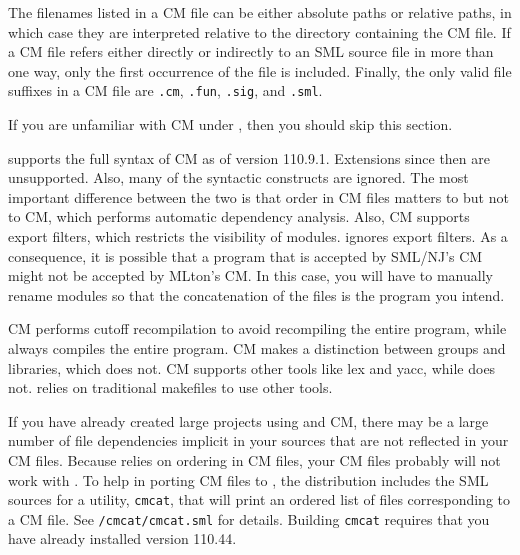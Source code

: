 The filenames listed in a CM file can be either absolute paths or relative
paths, in which case they are interpreted relative to the directory containing
the CM file.  If a CM file refers either directly or indirectly to an SML source
file in more than one way, only the first occurrence of the file is included.
Finally, the only valid file suffixes in a CM file are {\tt .cm}, {\tt .fun},
{\tt .sig}, and {\tt .sml}.
%

If you are unfamiliar with CM under {\smlnj}, then you should skip this
section.

{\mlton} supports the full syntax of CM as of {\smlnj} version 110.9.1.
Extensions since then are unsupported.  Also, many of the syntactic
constructs are ignored.  The most important difference between the two is that
order in CM files matters to {\mlton} but not to CM, which performs automatic
dependency analysis.  Also, CM supports export filters, which restricts the
visibility of modules.  {\mlton} ignores export filters.  As a consequence, it
is possible that a program that is accepted by SML/NJ's CM might not be accepted
by MLton's CM.  In this case, you will have to manually rename modules so that
the concatenation of the files is the program you intend.

CM performs cutoff recompilation to avoid recompiling the entire program, while
{\mlton} always compiles the entire program.  CM makes a distinction between
groups and libraries, which {\mlton} does not.  CM supports other tools like lex
and yacc, while {\mlton} does not.  {\mlton} relies on traditional makefiles to
use other tools.
%

If you have already created large projects using {\smlnj} and CM, there may be a
large number of file dependencies implicit in your sources that are not
reflected in your CM files.  Because {\mlton} relies on ordering in CM files,
your CM files probably will not work with {\mlton}.  To help in porting CM files
to {\mlton}, the {\mlton} distribution includes the SML sources for a
utility, {\tt cmcat}, that will print an ordered list of files corresponding to
a CM file.  See {\tt \doc/cmcat/cmcat.sml} for details.  Building {\tt cmcat}
requires that you have already installed {\smlnj} version 110.44.
